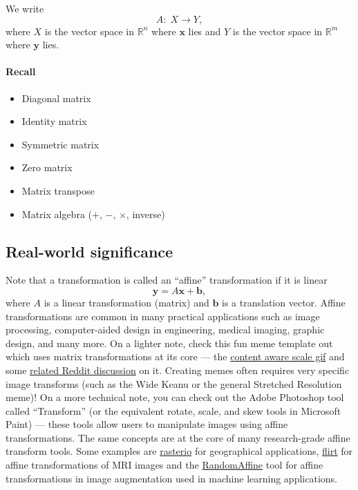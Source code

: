 \documentclass{ee102_notes}
\begin{document}
We write
\[
A:\; X \to Y,
\]
where $X$ is the vector space in $\mathbb{R}^n$ where $\mathbf{x}$ lies and $Y$ is the vector space in $\mathbb{R}^m$ where $\mathbf{y}$ lies.

\paragraph{Recall}
\begin{itemize}
  \item Diagonal matrix
  \item Identity matrix
  \item Symmetric matrix
  \item Zero matrix
  \item Matrix transpose
  \item Matrix algebra ($+$, $-$, $\times$, inverse)
\end{itemize}
\subsection{Real-world significance}
Note that a transformation is called an ``affine'' transformation if it is linear
\[
\mathbf{y} = A\mathbf{x} + \mathbf{b},
\]
where $A$ is a linear transformation (matrix) and $\mathbf{b}$ is a translation vector. Affine transformations are common in many practical applications such as image processing, computer-aided design in engineering, medical imaging, graphic design, and many more. On a lighter note, check this fun meme template out which uses matrix transformations at its core --- the \href{https://www.youtube.com/watch?v=hYdmPw-SrMQ}{content aware scale gif} and some \href{https://www.reddit.com/r/davinciresolve/comments/1780z24/how\_to\_do\_content\_aware\_scale\_meme\_effect\_for/}{related Reddit discussion} on it. Creating memes often requires very specific image transforms (such as the Wide Keanu or the general Stretched Resolution meme)! On a more technical note, you can check out the Adobe Photoshop tool called ``Transform'' (or the equivalent rotate, scale, and skew tools in Microsoft Paint) --- these tools allow users to manipulate images using affine transformations. The same concepts are at the core of many research-grade affine transform tools. Some examples are \href{https://affine.readthedocs.io/en/latest/index.html#}{rasterio} for geographical applications, \href{https://open.win.ox.ac.uk/pages/fsl/fslpy/_modules/fsl/transform/flirt.html}{flirt} for affine transformations of MRI images and the \href{https://pytorch.org/vision/stable/transforms.html#torchvision.transforms.RandomAffine}{RandomAffine} tool for affine transformations in image augmentation used in machine learning applications.
\end{document}
